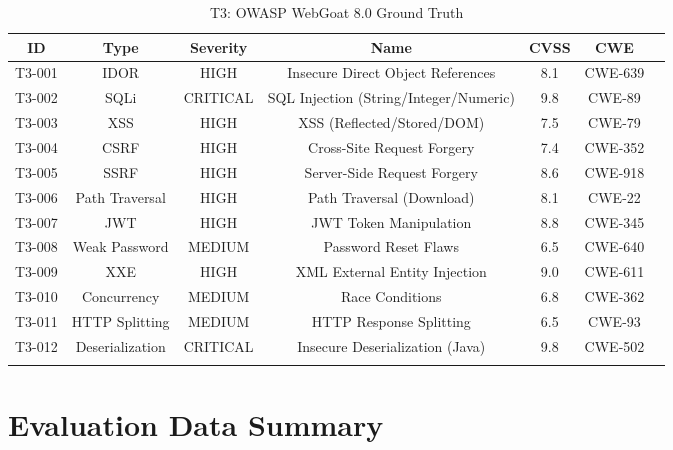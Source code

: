 \documentclass[12pt,a4paper,oneside]{book}
\begin{document}
\begin{longtable}{|c|c|c|c|c|c|c|}
\hline
\textbf{ID} & \textbf{Type} & \textbf{Severity} & \textbf{Name} & \textbf{CVSS} & \textbf{CWE} \\ \hline
\endhead
T3-001 & IDOR & HIGH & Insecure Direct Object References & 8.1 & CWE-639 \\ \hline
T3-002 & SQLi & CRITICAL & SQL Injection (String/Integer/Numeric) & 9.8 & CWE-89 \\ \hline
T3-003 & XSS & HIGH & XSS (Reflected/Stored/DOM) & 7.5 & CWE-79 \\ \hline
T3-004 & CSRF & HIGH & Cross-Site Request Forgery & 7.4 & CWE-352 \\ \hline
T3-005 & SSRF & HIGH & Server-Side Request Forgery & 8.6 & CWE-918 \\ \hline
T3-006 & Path Traversal & HIGH & Path Traversal (Download) & 8.1 & CWE-22 \\ \hline
T3-007 & JWT & HIGH & JWT Token Manipulation & 8.8 & CWE-345 \\ \hline
T3-008 & Weak Password & MEDIUM & Password Reset Flaws & 6.5 & CWE-640 \\ \hline
T3-009 & XXE & HIGH & XML External Entity Injection & 9.0 & CWE-611 \\ \hline
T3-010 & Concurrency & MEDIUM & Race Conditions & 6.8 & CWE-362 \\ \hline
T3-011 & HTTP Splitting & MEDIUM & HTTP Response Splitting & 6.5 & CWE-93 \\ \hline
T3-012 & Deserialization & CRITICAL & Insecure Deserialization (Java) & 9.8 & CWE-502 \\ \hline
\caption{T3: OWASP WebGoat 8.0 Ground Truth}
\label{tab:t3_ground_truth}
\end{longtable}

\chapter{Evaluation Data Summary}
\end{document}
